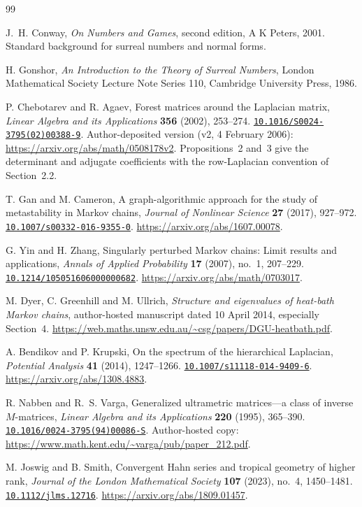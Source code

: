\documentclass[11pt]{article}
\numberwithin{equation}{section}
\theoremstyle{definition}
\theoremstyle{remark}
\newcommand{\doi}[1]{\href{https://doi.org/#1}{\texttt{#1}}}
\begin{document}
\begin{thebibliography}{99}
\small

J.~H. Conway,
\emph{On Numbers and Games}, second edition,
A K Peters, 2001.
Standard background for surreal numbers and normal forms.

H. Gonshor,
\emph{An Introduction to the Theory of Surreal Numbers},
London Mathematical Society Lecture Note Series 110,
Cambridge University Press, 1986.

P. Chebotarev and R. Agaev,
Forest matrices around the Laplacian matrix,
\emph{Linear Algebra and its Applications} \textbf{356} (2002), 253--274.
\doi{10.1016/S0024-3795(02)00388-9}.
Author-deposited version (v2, 4 February 2006):
\url{https://arxiv.org/abs/math/0508178v2}.
Propositions~2 and~3 give the determinant and adjugate coefficients with the
row-Laplacian convention of Section~2.2.

T. Gan and M. Cameron,
A graph-algorithmic approach for the study of metastability in Markov chains,
\emph{Journal of Nonlinear Science} \textbf{27} (2017), 927--972.
\doi{10.1007/s00332-016-9355-0}.
\url{https://arxiv.org/abs/1607.00078}.

G. Yin and H. Zhang,
Singularly perturbed Markov chains: Limit results and applications,
\emph{Annals of Applied Probability} \textbf{17} (2007), no.~1, 207--229.
\doi{10.1214/105051606000000682}.
\url{https://arxiv.org/abs/math/0703017}.

M. Dyer, C. Greenhill and M. Ullrich,
\emph{Structure and eigenvalues of heat-bath Markov chains},
author-hosted manuscript dated 10 April 2014, especially Section~4.
\url{https://web.maths.unsw.edu.au/~csg/papers/DGU-heatbath.pdf}.

A. Bendikov and P. Krupski,
On the spectrum of the hierarchical Laplacian,
\emph{Potential Analysis} \textbf{41} (2014), 1247--1266.
\doi{10.1007/s11118-014-9409-6}.
\url{https://arxiv.org/abs/1308.4883}.

R. Nabben and R.~S. Varga,
Generalized ultrametric matrices---a class of inverse $M$-matrices,
\emph{Linear Algebra and its Applications} \textbf{220} (1995), 365--390.
\doi{10.1016/0024-3795(94)00086-S}.
Author-hosted copy:
\url{https://www.math.kent.edu/~varga/pub/paper_212.pdf}.

M. Joswig and B. Smith,
Convergent Hahn series and tropical geometry of higher rank,
\emph{Journal of the London Mathematical Society}
\textbf{107} (2023), no.~4, 1450--1481.
\doi{10.1112/jlms.12716}.
\url{https://arxiv.org/abs/1809.01457}.


\end{thebibliography}
\end{document}
